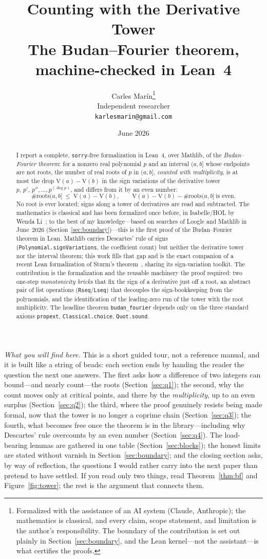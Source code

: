 \documentclass[11pt]{article}
\title{\bf Counting with the Derivative Tower\\[4pt]
  \large\normalfont The Budan--Fourier theorem, machine-checked in Lean~4}
\author{Carles Mar\'in\thanks{Formalized with the assistance of an AI system (Claude,
Anthropic); the mathematics is classical, and every claim, scope statement, and limitation is
the author's responsibility. The boundary of the contribution is set out plainly in
Section~\ref{sec:boundary}, and the Lean kernel---not the assistant---is what certifies the
proofs.}\\[3pt]
  \normalsize Independent researcher\\
  \normalsize \texttt{karlesmarin@gmail.com}}
\date{June 2026}
\newcommand{\lean}[1]{\texttt{#1}}
\newcommand{\V}{\mathrm{V}}
\begin{document}
\maketitle

\begin{abstract}
I report a complete, \lean{sorry}-free formalization in Lean~4, over Mathlib, of the
\emph{Budan--Fourier theorem}: for a nonzero real polynomial $p$ and an interval $(a,b]$ whose
endpoints are not roots, the number of real roots of $p$ in $(a,b]$, \emph{counted with
multiplicity}, is at most the drop $\V(a)-\V(b)$ in the sign variations of the derivative tower
$p,\,p',\,p'',\dots,p^{(\deg p)}$, and differs from it by an even number:
\[
  \#\mathrm{roots}(a,b]\ \le\ \V(a)-\V(b),\qquad \V(a)-\V(b)-\#\mathrm{roots}(a,b]\ \text{is even.}
\]
No root is ever located; signs along a tower of derivatives are read and subtracted. The
mathematics is classical and has been formalized once before, in Isabelle/HOL by Wenda
Li~\cite{liBF}; to the best of my knowledge---based on searches of Loogle and Mathlib in
June~2026 (Section~\ref{sec:boundary})---this is the first proof of the Budan--Fourier theorem in
Lean. Mathlib carries Descartes' rule of signs (\lean{Polynomial.signVariations}, the coefficient
count) but neither the derivative tower nor the interval theorem; this work fills that gap and is
the exact companion of a recent Lean formalization of Sturm's theorem~\cite{sturmlean}, sharing its
sign-variation toolkit. The contribution is the formalization and the reusable machinery the
proof required: two one-step \emph{monotonicity bricks} that fix the sign of a derivative just off a
root, an abstract pair of list operations (\lean{Rseq}/\lean{Lseq}) that decouples the
sign-bookkeeping from the polynomials, and the identification of the leading-zero run of the tower
with the root multiplicity. The headline theorem \lean{budan\_fourier} depends only on the three
standard axioms \lean{propext}, \lean{Classical.choice}, \lean{Quot.sound}.
\end{abstract}

\medskip
\noindent\emph{What you will find here.} This is a short guided tour, not a reference manual, and it
is built like a string of beads: each section ends by handing the reader the question the next one
answers. The first asks how a difference of two integers can bound---and nearly count---the roots
(Section~\ref{sec:q1}); the second, why the count moves only at critical points, and there by the
\emph{multiplicity}, up to an even surplus (Section~\ref{sec:q2}); the third, where the proof
genuinely resists being made formal, now that the tower is no longer a coprime chain
(Section~\ref{sec:q3}); the fourth, what becomes free once the theorem is in the library---including
why Descartes' rule overcounts by an even number (Section~\ref{sec:q4}). The load-bearing lemmas are
gathered in one table (Section~\ref{sec:blocks}); the honest limits are stated without varnish in
Section~\ref{sec:boundary}; and the closing section asks, by way of reflection, the questions I
would rather carry into the next paper than pretend to have settled. If you read only two things,
read Theorem~\ref{thm:bf} and Figure~\ref{fig:tower}; the rest is the argument that connects them.
\end{document}
